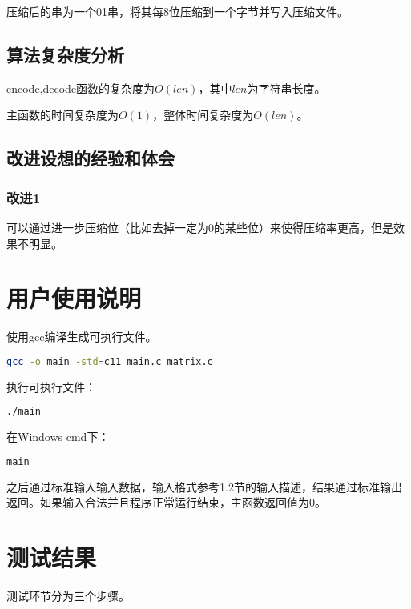 \documentclass{article}
\begin{document}
压缩后的串为一个01串，将其每8位压缩到一个字节并写入压缩文件。

\subsection{算法复杂度分析}

encode,decode函数的复杂度为$O(len)$，其中$len$为字符串长度。

主函数的时间复杂度为$O(1)$，整体时间复杂度为$O(len)$。

\subsection{改进设想的经验和体会}

\subsubsection{改进1}

可以通过进一步压缩位（比如去掉一定为0的某些位）来使得压缩率更高，但是效果不明显。

\section{用户使用说明}

使用gcc编译生成可执行文件。

\begin{lstlisting}[language={bash},
    basicstyle=\small\consolas]
gcc -o main -std=c11 main.c matrix.c
\end{lstlisting}

执行可执行文件：

\begin{lstlisting}[language={bash},
    basicstyle=\small\consolas]
./main
\end{lstlisting}

在Windows cmd下：

\begin{lstlisting}[language={bash},
    basicstyle=\small\consolas]
main
\end{lstlisting}

之后通过标准输入输入数据，输入格式参考1.2节的输入描述，结果通过标准输出返回。如果输入合法并且程序正常运行结束，主函数返回值为0。

\section{测试结果}

测试环节分为三个步骤。
\end{document}
